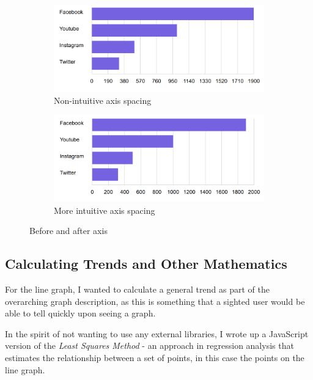 \documentclass[ %
                    author={Aleena Baig},
                supervisor={Dr Simon Lock},
                    degree={BSc},
                     title={On Making Web Accessible Graphs},
                  subtitle={},
                      year={2019} ]{dissertation}
\begin{document}
\begin{figure}[h]
  \centering
  \begin{subfigure}[b]{0.4\linewidth}
    \includegraphics[width=\linewidth]{images/awkwardAxis.PNG}
     \caption{Non-intuitive axis spacing}
  \end{subfigure}
  \begin{subfigure}[b]{0.4\linewidth}
    \includegraphics[width=\linewidth]{images/lessAwkwardAxis.PNG}
    \caption{More intuitive axis spacing}
  \end{subfigure}
  \caption{Before and after axis}
  \label{fig:Awkwardsaxis}
\end{figure}

\subsection{Calculating Trends and Other Mathematics}

For the line graph, I wanted to calculate a general trend as part of the overarching graph description, as this is something that a sighted user would be able to tell quickly upon seeing a graph.

In the spirit of not wanting to use any external libraries, I wrote up a JavaScript version of the \textit{Least Squares Method} -  an approach in regression analysis that estimates the relationship between a set of points, in this case the points on the line graph.
\end{document}

